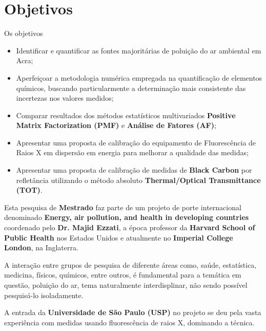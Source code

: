 \section{Objetivos}
%
%
Os objetivos 

\begin{itemize}
  \item Identificar e quantificar as fontes majoritárias de poluição do ar ambiental em Acra;
  \item Aperfeiçoar a metodologia numérica empregada na quantificação de elementos químicos, 
        buscando particularmente a determinação mais consistente das incertezas nos valores medidos;
  \item Comparar resultados dos métodos estatísticos multivariados
        \textbf{Positive Matrix Factorization (PMF)} e \textbf{Análise de Fatores (AF)};
  \item Apresentar uma proposta de calibração do equipamento de Fluorescência de Raios X
        em dispersão em energia para melhorar a qualidade das medidas;
  \item Apresentar uma proposta de calibração de medidas de \textbf{Black Carbon} por refletância
        utilizando o método absoluto \textbf{Thermal/Optical Transmittance (TOT)}.
\end{itemize}


Esta pesquisa de \textbf{Mestrado} faz parte de um projeto de porte 
internacional denominado \textbf{Energy, air pollution, and health 
in developing countries} coordenado pelo \textbf{Dr. Majid Ezzati}, 
a época professor da \textbf{Harvard School of Public Health} nos 
Estados Unidos e atualmente no \textbf{Imperial College London}, 
na Inglaterra.  

A interação entre grupos de pesquisa de diferente áreas como, saúde, 
estatística, medicina, físicos, químicos, entre outros, é fundamental
para a temática em questão, poluição do ar, tema naturalmente 
interdisplinar, não sendo possível pesquisá-lo isoladamente. 

A entrada da \textbf{Universidade de São Paulo (USP)} no projeto se deu pela
vasta experiência com medidas usando fluorescência de raios X, dominando a técnica.
